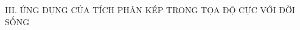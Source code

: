 \documentclass[preview]{standalone}
\begin{document}
\begin{center}
III. ỨNG DỤNG CỦA TÍCH PHÂN KÉP TRONG TỌA ĐỘ CỰC VỚI ĐỜI SỐNG
\end{center}
\end{document}
